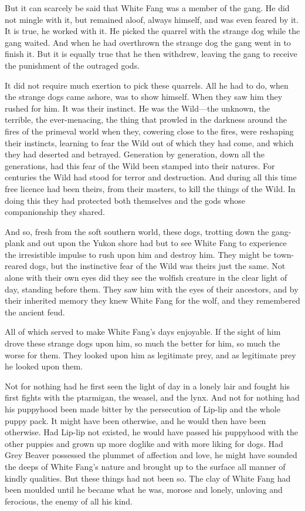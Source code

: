 \documentclass[10pt]{book}
\begin{document}
But it can scarcely be said that White Fang was a member of the gang.
He did not mingle with it, but remained aloof, always himself, and was
even feared by it. It is true, he worked with it. He picked the quarrel
with the strange dog while the gang waited. And when he had overthrown
the strange dog the gang went in to finish it. But it is equally true
that he then withdrew, leaving the gang to receive the punishment of
the outraged gods.

It did not require much exertion to pick these quarrels. All he had to
do, when the strange dogs came ashore, was to show himself. When they
saw him they rushed for him. It was their instinct. He was the Wild—the
unknown, the terrible, the ever-menacing, the thing that prowled in the
darkness around the fires of the primeval world when they, cowering
close to the fires, were reshaping their instincts, learning to fear
the Wild out of which they had come, and which they had deserted and
betrayed. Generation by generation, down all the generations, had this
fear of the Wild been stamped into their natures. For centuries the
Wild had stood for terror and destruction. And during all this time
free licence had been theirs, from their masters, to kill the things of
the Wild. In doing this they had protected both themselves and the gods
whose companionship they shared.

And so, fresh from the soft southern world, these dogs, trotting down
the gang-plank and out upon the Yukon shore had but to see White Fang
to experience the irresistible impulse to rush upon him and destroy
him. They might be town-reared dogs, but the instinctive fear of the
Wild was theirs just the same. Not alone with their own eyes did they
see the wolfish creature in the clear light of day, standing before
them. They saw him with the eyes of their ancestors, and by their
inherited memory they knew White Fang for the wolf, and they remembered
the ancient feud.

All of which served to make White Fang’s days enjoyable. If the sight
of him drove these strange dogs upon him, so much the better for him,
so much the worse for them. They looked upon him as legitimate prey,
and as legitimate prey he looked upon them.

Not for nothing had he first seen the light of day in a lonely lair and
fought his first fights with the ptarmigan, the weasel, and the lynx.
And not for nothing had his puppyhood been made bitter by the
persecution of Lip-lip and the whole puppy pack. It might have been
otherwise, and he would then have been otherwise. Had Lip-lip not
existed, he would have passed his puppyhood with the other puppies and
grown up more doglike and with more liking for dogs. Had Grey Beaver
possessed the plummet of affection and love, he might have sounded the
deeps of White Fang’s nature and brought up to the surface all manner
of kindly qualities. But these things had not been so. The clay of
White Fang had been moulded until he became what he was, morose and
lonely, unloving and ferocious, the enemy of all his kind.
\end{document}
